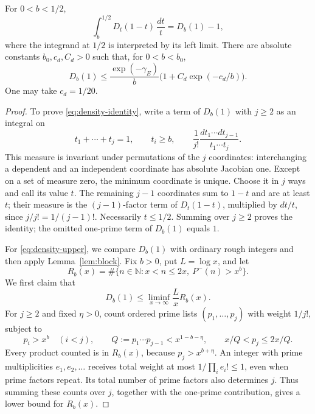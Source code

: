 \begin{lemma}\label{lem:density}
For $0<b<1/2$,
\begin{equation}\label{eq:density-identity}
 \int_b^{1/2}D_t(1-t)\,\frac{dt}{t}=D_b(1)-1,
\end{equation}
where the integrand at $1/2$ is interpreted by its left limit.
There are absolute constants $b_0,c_d,C_d>0$ such that, for
$0<b<b_0$,
\begin{equation}\label{eq:density-upper}
 D_b(1)\le\frac{\exp(-\gamma_E)}{b}
                 \bigl(1+C_d\exp(-c_d/b)\bigr).
\end{equation}
One may take \(c_d=1/20\).
\end{lemma}

\begin{proof}
To prove \eqref{eq:density-identity}, write a term of $D_b(1)$ with
$j\ge2$ as an integral on
\[
 t_1+\cdots+t_j=1,\qquad t_i\ge b,
 \qquad
 \frac1{j!}\frac{dt_1\cdots dt_{j-1}}{t_1\cdots t_j}.
\]
This measure is invariant under permutations of the $j$ coordinates:
interchanging a dependent and an independent coordinate has absolute
Jacobian one. Except on a set of measure zero, the minimum coordinate
is unique. Choose it in $j$ ways and call its value $t$.
The remaining $j-1$ coordinates sum to $1-t$ and are at least $t$;
their measure is the $(j-1)$-factor term of $D_t(1-t)$, multiplied
by $dt/t$, since $j/j!=1/(j-1)!$. Necessarily $t\le1/2$.
Summing over $j\ge2$ proves the identity; the omitted one-prime
term of $D_b(1)$ equals $1$.

For \eqref{eq:density-upper}, we compare $D_b(1)$ with ordinary
rough integers and then apply Lemma~\ref{lem:block}. Fix $b>0$,
put $L=\log x$, and let
\[
 R_b(x)=\#\{n\in\mathbb{N}:x<n\le2x,\ P^-(n)>x^b\}.
\]
We first claim that
\begin{equation}\label{eq:density-rough-lower}
 D_b(1)\le\liminf_{x\to\infty}\frac{L}{x}R_b(x).
\end{equation}
For $j\ge2$ and fixed $\eta>0$, count ordered prime lists
$(p_1,\ldots,p_j)$ with weight $1/j!$, subject to
\[
 p_i>x^b\quad(i<j),\qquad
 Q:=p_1\cdots p_{j-1}<x^{1-b-\eta},\qquad
 x/Q<p_j\le2x/Q.
\]
Every product counted is in $R_b(x)$, because $p_j>x^{b+\eta}$.
An integer with prime multiplicities $e_1,e_2,\ldots$ receives
total weight at most $1/\prod_i e_i!\le1$, even when prime factors
repeat. Its total number of prime factors also determines $j$.
Thus summing these counts over $j$, together with the one-prime
contribution, gives a lower bound for $R_b(x)$.


\end{proof}
